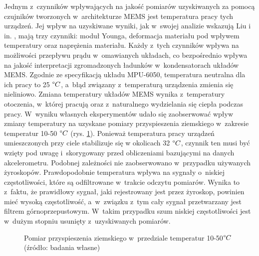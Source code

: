 Jednym z~czynników wpływających na jakość pomiarów uzyskiwanych za pomocą czujników tworzonych w~architekturze MEMS jest temperatura pracy tych urządzeń. Jej wpływ na uzyskiwane wyniki, jak w~swojej analizie wskazują Liu i in. \cite{Liu2007, Liu2015}, mają trzy czynniki: moduł Younga, deformacja materiału pod wpływem temperatury oraz naprężenia materiału. Każdy z~tych czynników wpływa na możliwości przepływu prądu w~omawianych układach, co bezpośrednio wpływa na jakość interpretacji zgromadzonych ładunków w~kondensatorach układów MEMS. Zgodnie ze specyfikacją układu MPU-6050, temperatura neutralna dla ich pracy to 25 $\degree C$, a~błąd związany z~temperaturą urządzenia zmienia się nieliniowo. Zmiana temperatury układów MEMS wynika z~temperatury otoczenia, w~której pracują oraz z~naturalnego wydzielania się ciepła podczas pracy. W~wyniku własnych eksperymentów udało się zaobserwować wpływ zmiany temperatury na uzyskane pomiary przyspieszenia ziemskiego w~zakresie temperatur 10-50 $\degree C$ (rys. \ref{fig:characteristics:imu:temp}). Ponieważ temperatura pracy urządzeń umieszczonych przy ciele stabilizuje się w okolicach 32 $\degree C$, czynnik ten musi być wzięty pod uwagę i~skorygowany przed obliczeniami bazującymi na danych akcelerometru. Podobnej zależności nie zaobserwowano w~przypadku używanych żyroskopów. Prawdopodobnie temperatura wpływa na sygnały o~niskiej częstotliwości, które są odfiltrowane w~trakcie odczytu pomiarów. Wynika to z~faktu, że prawidłowy sygnał, jaki rejestrowany jest przez żyroskop, powinien mieć wysoką częstotliwość, a~w~związku z~tym cały sygnał przetwarzany jest filtrem górnoprzepustowym. W~takim przypadku szum niskiej częstotliwości jest w~dużym stopniu usunięty z~uzyskiwanych pomiarów.
						
\begin{savenotes}
	\begin{figure}[!htb]
		\centering
															
		\caption[Pomiar przyspieszenia ziemskiego w~przedziale temperatur 10-50$\degree C$]{Pomiar przyspieszenia ziemskiego w~przedziale temperatur 10-50$\degree C$ (źródło: badania własne)}
		\label{fig:characteristics:imu:temp}
	\end{figure}
\end{savenotes}
									
